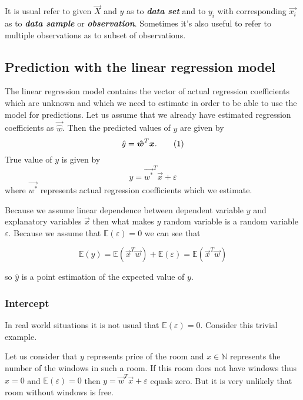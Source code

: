 \begin{note}
    It is usual refer to given $\vec{X}$ and $y$ as to \textbf{\textit{data set}} and to $y_i$ with corresponding $\vec{x_i}$ as to \textbf{\textit{data sample}} or \textbf{\textit{observation}}. Sometimes it's also useful to refer to multiple observations as to subset of observations.
\end{note}

\subsection{Prediction with the linear regression model}
The linear regression model contains the vector of actual regression coefficients which are unknown and which we need to estimate in order to be able to use the model for predictions. Let us assume that we already have estimated regression coefficients as $\vec{\hat{w}}$. Then the predicted values of $y$ are given by
\begin{equation}
    \hat{y} = \vec{\hat{w}}^T\vec{x}. \numberthis
\end{equation}
True value of $y$ is given by 
\begin{equation}
    y = \vec{w^{*}}^T\vec{x} + \varepsilon
\end{equation}
where $ \vec{w^{*}}$  represents actual regression coefficients which we estimate. 

Because we assume linear dependence between dependent variable $y$ and explanatory variables $\vec{x}$ then what makes $y$ random variable is a random variable $\varepsilon$. Because we assume that $\mathbb{E}(\varepsilon) = 0$ we can see that 

\begin{equation} \label{equation:vary}
\mathbb{E}(y) =\mathbb{E}(\vec{x}^T\vec{w}) + \mathbb{E}(\varepsilon) = \mathbb{E}(\vec{x}^T\vec{w})
\end{equation}

so $\hat{y}$ is a point estimation of the expected value of $y$.

\subsubsection*{Intercept}
In real world situations it is not usual that $\mathbb{E}(\varepsilon) = 0$. Consider this trivial example.
\begin{example} \label{example:intercept}
Let us consider that $y$ represents price of the room and $x \in \mathbb{N}$ represents the number of the windows in such a room. If this room does not have windows thus $x = 0$ and $\mathbb{E}(\varepsilon) = 0$ then $ y = \vec{w}^T\vec{x} + \varepsilon$ equals zero. But it is very unlikely that room without windows is free. 
\end{example}

